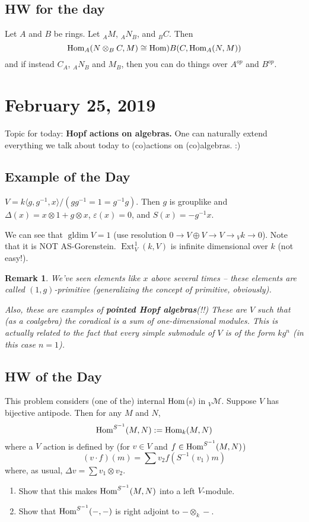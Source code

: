 \documentclass[12pt]{article}
\theoremstyle{break}
\theoremstyle{nonumberbreak}
\theoremstyle{changebreak}
\theoremstyle{break}
\theoremstyle{nonumberbreak}
\theoremstyle{nonumberplain}
\theoremstyle{change}
\newtheorem{rmk}[thm]{Remark}
\DeclareMathOperator{\Ext}{Ext}
\DeclareMathOperator{\gldim}{gldim}
\newcommand*{\Hom}{\ensuremath\text{Hom}}
\newcommand*{\calM}{\mathcal{M}}
\begin{document}
\subsection{HW for the day}
\begin{prob}
	Let $A$ and $B$ be rings. Let $_AM$, $_AN_B$, and $_BC$. Then 
	\[\Hom_A(N\otimes_B C,M)\cong \Hom)B(C, \Hom_A(N,M))\]
	and if instead $C_A$, $_AN_B$ and $M_B$, then you can do things over $A^{op}$ and $B^{op}$.
\end{prob}

\section{February 25, 2019}
Topic for today: \textbf{Hopf actions on algebras.} One can naturally extend everything we talk about
today to (co)actions on (co)algebras. :)
\subsection{Example of the Day}
\begin{ex}\label{ex-22519}
	$V=k\langle g,g^{-1},x\rangle/(gg^{-1}=1=g^{-1}g)$. Then $g$ is grouplike and $\Delta(x)=x\otimes1+g\otimes x$, 
	$\varepsilon(x)=0$, and $S(x)=-g^{-1}x$.

	We can see that $\gldim V=1$ (use resolution $0\to V\oplus V\to V\to {_V k}\to 0$). Note that
	it is NOT AS-Gorenstein. $\Ext_V^1(k,V)$ is infinite dimensional over $k$ (not easy!).
\end{ex}
\begin{rmk}
	We've seen elements like $x$ above several times -- these elements are called $(1,g)$-primitive 
	(generalizing the concept of primitive, obviously). 

	Also, these are examples of \textbf{pointed Hopf algebras}(!!) These are $V$ such that (as a
	coalgebra) the coradical is a sum of one-dimensional modules. This is actually related to the fact 
	that every simple submodule of $V$ is of the form $kg^n$ (in this case $n=1$).
\end{rmk}
\subsection{HW of the Day}
\begin{prob}
	This problem considers (one of the) internal $\Hom$(s) in $_V\calM$. Suppose $V$ has bijective 
	antipode. Then for any $M$ and $N$,
	\[\Hom^{S^{-1}}(M,N):=\Hom_k(M,N)\]
	where a $V$ action is defined by (for $v\in V$ and $f\in\Hom^{S^{-1}}(M,N)$) 
	\[(v\cdot f)(m)=\sum v_2f(S^{-1}(v_1)m)\]
	where, as usual, $\Delta v=\sum v_1\otimes v_2$.
	\begin{enumerate}
		\item Show that this makes $\Hom^{S^{-1}}(M,N)$ into a left $V$-module.
		\item Show that $\Hom^{S^{-1}}(-,-)$ is right adjoint to $-\otimes_k -$.
	\end{enumerate}
\end{prob}
\end{document}
